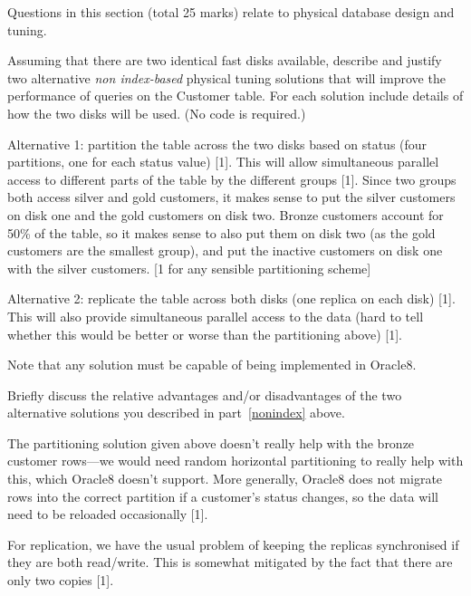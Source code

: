 \documentclass{ouexam}
\begin{document}
\begin{examsection}{25}{}{Questions in this section (total 25 marks) relate to
physical database design and tuning.}
\begin{question}{10}
	\begin{subquestion}{7}
		\begin{subsubquestion}{5}
			\label{nonindex}
			Assuming that there are two identical fast disks available,
			describe and justify two alternative \emph{non index-based}
			physical tuning solutions that will improve the performance of
			queries on the \textsf{Customer} table. For each solution include
			details of how the two disks will be used. (No code is required.)
			\begin{marking}
				Alternative 1: partition the table across the two disks based
				on status (four partitions, one for each status value) [1].
				This will allow simultaneous parallel access to different parts
				of the table by the different groups [1]. Since two groups both
				access silver and gold customers, it makes sense to put the
				silver customers on disk one and the gold customers on disk
				two. Bronze customers account for 50\% of the table, so it
				makes sense to also put them on disk two (as the gold customers
				are the smallest group), and put the inactive customers on disk
				one with the silver customers. [1 for any sensible partitioning
				scheme]
	
				Alternative 2: replicate the table across both disks (one
				replica on each disk) [1]. This will also provide simultaneous
				parallel access to the data (hard to tell whether this would be
				better or worse than the partitioning above) [1].
	
				Note that any solution must be capable of being implemented in
				Oracle8.
			\end{marking}
		\end{subsubquestion}

		\begin{subsubquestion}{2}
			Briefly discuss the relative advantages and/or disadvantages of the
			two alternative solutions you described in part~\ref{nonindex}
			above.
			\begin{marking}
				The partitioning solution given above doesn't really help with
				the bronze customer rows---we would need random horizontal
				partitioning to really help with this, which Oracle8 doesn't
				support. More generally, Oracle8 does not migrate rows into the
				correct partition if a customer's status changes, so the data
				will need to be reloaded occasionally [1].

				For replication, we have the usual problem of keeping the
				replicas synchronised if they are both read/write. This is
				somewhat mitigated by the fact that there are only two copies
				[1].
			\end{marking}
		\end{subsubquestion}
	\end{subquestion}
	

\end{question}
\end{examsection}
\end{document}

